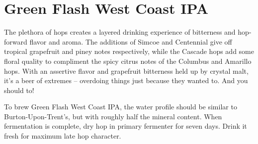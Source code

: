 \documentclass[10pt,oneside]{scrbook}
\begin{document}
\begin{ingredientsblock}

\begin{malts}
\end{malts}

\begin{hops}
\end{hops}

\begin{yeasts}
\end{yeasts}

\end{ingredientsblock}

\chapter*{Green Flash West Coast IPA}

\begin{aboutblock}
The plethora of hops creates a layered drinking experience of bitterness and hop-forward flavor
and aroma. The additions of Simcoe and Centennial give off tropical grapefruit and piney notes
respectively, while the Cascade hops add some floral quality to compliment the spicy citrus notes
of the Columbus and Amarillo hops.
With an assertive flavor and grapefruit bitterness held up by crystal malt, it's a beer of extremes -- overdoing things just because they wanted to. And you should to!
\end{aboutblock}


\begin{methodandtiming}
 
\begin{mashsteps}
\end{mashsteps}

\begin{fermentationsteps}
\end{fermentationsteps}

\begin{directions}
To brew Green Flash West Coast IPA, the water profile should be similar to Burton-Upon-Trent's,
but with roughly half the mineral content. When fermentation is complete, dry hop in primary
fermenter for seven days. Drink it fresh for maximum late hop character.
\end{directions}

\end{methodandtiming}
\end{document}
